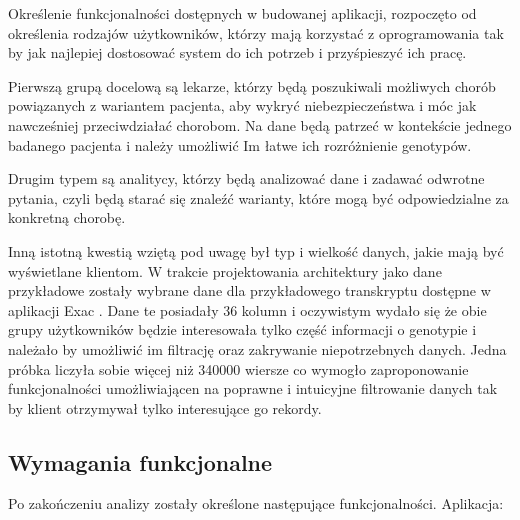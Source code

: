 \documentclass[a4paper,12pt,twoside]{article}
\begin{document}

Określenie funkcjonalności dostępnych w budowanej aplikacji, rozpoczęto od określenia 
rodzajów użytkowników, którzy mają korzystać z oprogramowania tak by jak najlepiej dostosować
system do ich potrzeb i przyśpieszyć ich pracę.

Pierwszą grupą docelową są lekarze, którzy będą poszukiwali
możliwych chorób powiązanych z wariantem pacjenta, aby wykryć niebezpieczeństwa
i móc jak nawcześniej przeciwdziałać chorobom. 
Na dane będą patrzeć w kontekście jednego badanego pacjenta i należy umożliwić Im łatwe 
ich rozróżnienie genotypów. 

Drugim typem są analitycy, którzy będą analizować dane i zadawać 
odwrotne pytania, czyli będą starać się znaleźć warianty, które mogą być odpowiedzialne
za konkretną chorobę. 

Inną istotną kwestią wziętą pod uwagę był typ i wielkość danych, jakie mają być wyświetlane klientom.
W trakcie projektowania architektury jako dane przykładowe zostały wybrane dane dla przykładowego transkryptu dostępne w aplikacji Exac \cite{exac}. Dane te posiadały 36 kolumn i oczywistym wydało się że obie grupy użytkowników będzie interesowała tylko część informacji o genotypie i należało by umożliwić im filtrację oraz zakrywanie niepotrzebnych danych. 
Jedna próbka liczyła sobie więcej niż 340000 wiersze co wymogło zaproponowanie 
funkcjonalności umożliwiającen na poprawne i intuicyjne filtrowanie danych 
tak by klient otrzymywał tylko interesujące go rekordy.

\newpage
\subsection{Wymagania funkcjonalne}
Po zakończeniu analizy zostały określone następujące funkcjonalności. Aplikacja:
\end{document}
